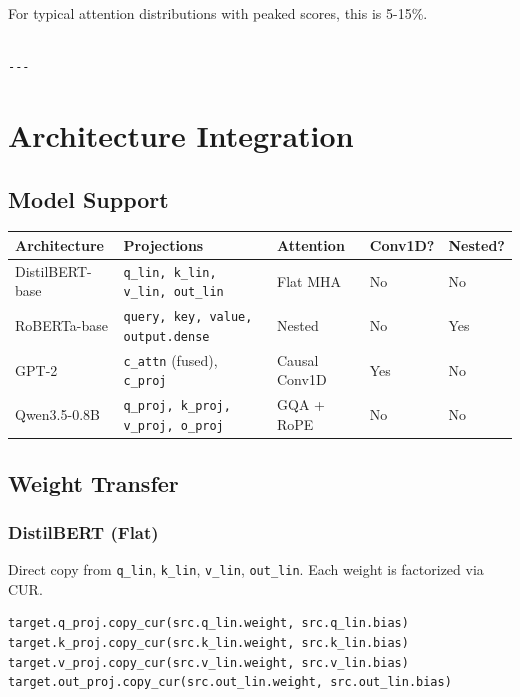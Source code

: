 For typical attention distributions with peaked scores, this is 5-15\%.
\begin{lstlisting}

---
\end{lstlisting}


\section{Architecture Integration}

\subsection{Model Support}

\begin{table}[H]
\centering
\small
\begin{tabular}{lllll}
\toprule
\textbf{Architecture} & \textbf{Projections} & \textbf{Attention} & \textbf{Conv1D?} & \textbf{Nested?} \\
\midrule
DistilBERT-base & \texttt{q\_lin, k\_lin, v\_lin, out\_lin} & Flat MHA & No & No \\
RoBERTa-base & \texttt{query, key, value, output.dense} & Nested & No & Yes \\
GPT-2 & \texttt{c\_attn} (fused), \texttt{c\_proj} & Causal Conv1D & Yes & No \\
Qwen3.5-0.8B & \texttt{q\_proj, k\_proj, v\_proj, o\_proj} & GQA + RoPE & No & No \\
\bottomrule
\end{tabular}
\end{table}

\subsection{Weight Transfer}

\subsubsection{DistilBERT (Flat)}

Direct copy from \texttt{q\_lin}, \texttt{k\_lin}, \texttt{v\_lin}, \texttt{out\_lin}. Each weight is 
factorized via CUR.

\begin{lstlisting}
target.q_proj.copy_cur(src.q_lin.weight, src.q_lin.bias)
target.k_proj.copy_cur(src.k_lin.weight, src.k_lin.bias)
target.v_proj.copy_cur(src.v_lin.weight, src.v_lin.bias)
target.out_proj.copy_cur(src.out_lin.weight, src.out_lin.bias)
\end{lstlisting}

